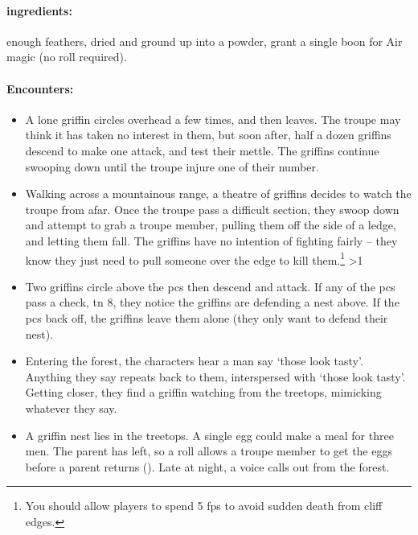 \begin{multicols}{2}
\paragraph{\Glspl{ingredient}:}
enough feathers, dried and ground up into a powder, grant a single \gls{boon} for Air magic (no roll required).

\paragraph{Encounters:}

\begin{itemize}

  \item
  A lone griffin circles overhead a few times, and then leaves.
  The troupe may think it has taken no interest in them, but soon after, half a dozen griffins descend to make one attack, and test their mettle.
  The griffins continue swooping down until the troupe injure one of their number.
  \item
  Walking across a mountainous range, a theatre of griffins decides to watch the troupe from afar.
  Once the troupe pass a difficult section, they swoop down and attempt to grab a troupe member, pulling them off the side of a ledge, and letting them fall.
  The griffins have no intention of fighting fairly -- they know they just need to pull someone over the edge to kill them.\footnote{You should allow players to spend 5 \glspl{fp} to avoid sudden death from cliff edges.}
  \ifnum\value{temperature}>1
    \item
    Two griffins circle above the \glspl{pc} then descend and attack.
    If any of the \glspl{pc} pass a  check, \gls{tn} 8, they notice the griffins are defending a nest above.
    If the \glspl{pc} back off, the griffins leave them alone (they only want to defend their nest).
  \else
    \item
    Entering the forest, the characters hear a man say `those look tasty'.
    Anything they say repeats back to them, interspersed with `those look tasty'.
    Getting closer, they find a griffin watching from the treetops, mimicking whatever they say.
  \fi
  \item
  \ifodd\value{r4}
    A griffin nest lies in the treetops.
    A single egg could make a meal for three men.
    The parent has left, so a  roll allows a troupe member to get the eggs before a parent returns (\tn[9]).
  \else
    Late at night, a voice calls out from the forest.


\end{itemize}
\end{multicols}
